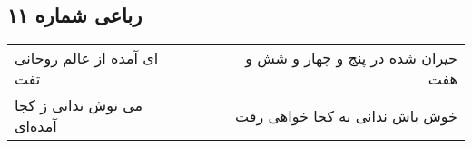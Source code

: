 \begin{center}
\section*{رباعی شماره ۱۱}
\label{sec:sh011}
\begin{longtable}{l p{0.5cm} r}
ای آمده از عالم روحانی تفت
&&
حیران شده در پنج و چهار و شش و هفت
\\
می نوش ندانی ز کجا آمده‌ای
&&
خوش باش ندانی به کجا خواهی رفت
\\
\end{longtable}
\end{center}
